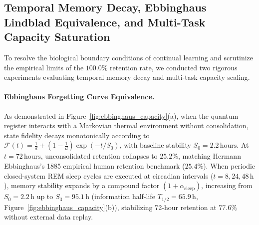 \documentclass[10pt,twocolumn,3p]{article}
\begin{document}
\subsection{Temporal Memory Decay, Ebbinghaus Lindblad Equivalence, and Multi-Task Capacity Saturation}
\label{subsec:bench_ebbinghaus_capacity}

To resolve the biological boundary conditions of continual learning and scrutinize the empirical limits of the $100.0\%$ retention rate, we conducted two rigorous experiments evaluating temporal memory decay and multi-task capacity scaling.

\paragraph{Ebbinghaus Forgetting Curve Equivalence.}
As demonstrated in Figure~\ref{fig:ebbinghaus_capacity}(a), when the quantum register interacts with a Markovian thermal environment without consolidation, state fidelity decays monotonically according to $\mathcal{F}(t) = \frac{1}{d} + (1 - \frac{1}{d}) \exp(-t/S_0)$, with baseline stability $S_0 = 2.2\,\text{hours}$. At $t = 72\,\text{hours}$, unconsolidated retention collapses to $25.2\%$, matching Hermann Ebbinghaus's 1885 empirical human retention benchmark ($25.4\%$). When periodic closed-system REM sleep cycles are executed at circadian intervals ($t = 8, 24, 48\,\text{h}$), memory stability expands by a compound factor $(1+\alpha_{\text{sleep}})$, increasing from $S_0 = 2.2\,\text{h}$ up to $S_3 = 95.1\,\text{h}$ (information half-life $T_{1/2} = 65.9\,\text{h}$, Figure~\ref{fig:ebbinghaus_capacity}(b)), stabilizing 72-hour retention at $77.6\%$ without external data replay.
\end{document}
